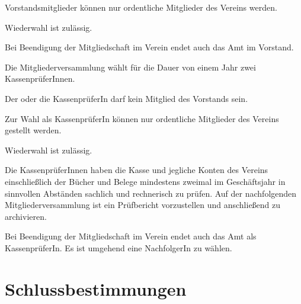 \documentclass[%
    parskip=half,
]{scrartcl}
\begin{document}
\begin{contract}
		Vorstandsmitglieder können nur ordentliche Mitglieder des Vereins werden.
		
		Wiederwahl ist zulässig.
		
		Bei Beendigung der Mitgliedschaft im Verein endet auch das Amt im Vorstand.
		
		
		Die Mitgliederversammlung wählt für die Dauer von einem Jahr zwei KassenprüferInnen.
		
		Der oder die KassenprüferIn darf kein Mitglied des Vorstands sein.
		
		Zur Wahl als KassenprüferIn können nur ordentliche Mitglieder des Vereins gestellt werden.
		
		Wiederwahl ist zulässig.
		
		Die KassenprüferInnen haben die Kasse und jegliche Konten des Vereins einschließlich der Bücher und Belege mindestens zweimal im Geschäftsjahr in sinnvollen Abständen sachlich und rechnerisch zu prüfen. Auf der nachfolgenden Mitgliederversammlung ist ein Prüfbericht vorzustellen und anschließend zu archivieren.
		
		Bei Beendigung der Mitgliedschaft im Verein endet auch das Amt als KassenprüferIn. Es ist umgehend eine NachfolgerIn zu wählen.
		
	\end{contract}
	
	\section{Schlussbestimmungen}
	
\end{document}
